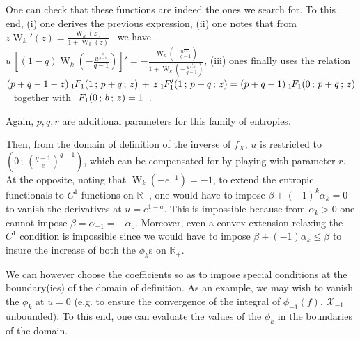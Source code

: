 \documentclass[entropy,article,submit,moreauthors,pdftex]{Definitions/mdpi}
\def\Rset{\mathbb{R}}%
\def\X{\mathcal{X}}%
\def\W{\operatorname{W}} %
\newcommand{\hypgeom}[2]{\mbox{}_{#1}\hspace{-1pt}F_{#2}}%
\begin{document}
%
One can check  that these functions are  indeed the ones we search  for. To this
end,  (i) one  derives the  previous  expression, (ii)  one notes  that from  $z
\W_k'(z) =  \frac{\W_k(z)}{1+\W_k(z)}$~\cite[Eq.~3.2]{CorGon96} we have \  $u \,
\left[  (1-q) \W_k\left(  - \frac{u^{\frac{1}{q-1}}}{q-1}  \right) \right]'  = -
\frac{\W_k\left(   -   \frac{u^{\frac{1}{q-1}}}{q-1}   \right)}{1+\W_k\left(   -
  \frac{u^{\frac{1}{q-1}}}{q-1} \right)}$, (iii) ones  finally uses the relation
$(p+q-1  - z)  \:  \hypgeom{1}{1}(1  \, ;  \,  p+q \,  ;  \, z)  \,  +  \, z  \:
\hypgeom{1}{1}'( 1 \, ; \, p+q \, ; \, z)  = (p + q - 1) \: \hypgeom{1}{1}( 0 \,
; \, p+q \,  ; \, z)$~\cite[13.4.11]{AbrSte70} together  with $\hypgeom{1}{1}( 0
\, ; \, b \, ; \, z) = 1$~\cite[13.1.2]{AbrSte70}.

Again, $p, q, r$ are additional parameters for this family of entropies.

Then, from the domain  of definition of the inverse of  $f_X$, $u$ is restricted
to $\left( 0  \, ; \, \left( \frac{q-1}{e} \right)^{q-1}  \right)$, which can be
compensated for  by playing with  parameter $r$.   At the opposite,  noting that
$\W_k\left( -e^{-1} \right)  = -1$, to extend the entropic  functionals to $C^1$
functions on $\Rset_+$, one  would have to impose $\beta +  (-1)^k \alpha_k = 0$
to vanish  the derivatives  at $u  = e^{1-a}$. This  is impossible  because from
$\alpha_k > 0$ one cannot impose  $\beta = \alpha_{-1} = - \alpha_0$.  Moreover,
even a  convex extension  relaxing the  $C^1$ condition  is impossible  since we
would have to impose $\beta + (-1) \alpha_k \le \beta$ to insure the increase of
both the $\phi_k$s on $\Rset_+$.

We can however choose the coefficients so as to impose special conditions at the
boundary(ies) of the domain of definition. As  an example, we may wish to vanish
the $\phi_k$  at $u  = 0$  (e.g. to ensure  the convergence  of the  integral of
$\phi_{-1}(f)$, $\X_{-1}$ unbounded).  To this  end, one can evaluate the values
of the $\phi_k$ in the boundaries of the domain.
\end{document}
